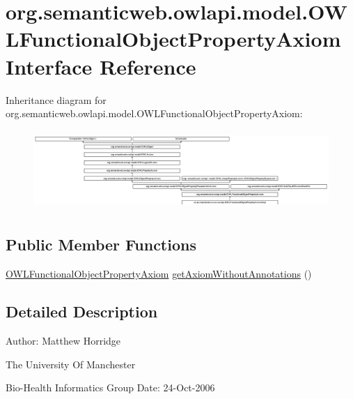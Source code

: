 \hypertarget{interfaceorg_1_1semanticweb_1_1owlapi_1_1model_1_1_o_w_l_functional_object_property_axiom}{\section{org.\-semanticweb.\-owlapi.\-model.\-O\-W\-L\-Functional\-Object\-Property\-Axiom Interface Reference}
\label{interfaceorg_1_1semanticweb_1_1owlapi_1_1model_1_1_o_w_l_functional_object_property_axiom}
}
Inheritance diagram for org.\-semanticweb.\-owlapi.\-model.\-O\-W\-L\-Functional\-Object\-Property\-Axiom\-:\begin{figure}[H]
\begin{center}
\leavevmode
\includegraphics[height=3.060109cm]{interfaceorg_1_1semanticweb_1_1owlapi_1_1model_1_1_o_w_l_functional_object_property_axiom}
\end{center}
\end{figure}
\subsection*{Public Member Functions}
\begin{DoxyCompactItemize}
\item 
\hyperlink{interfaceorg_1_1semanticweb_1_1owlapi_1_1model_1_1_o_w_l_functional_object_property_axiom}{O\-W\-L\-Functional\-Object\-Property\-Axiom} \hyperlink{interfaceorg_1_1semanticweb_1_1owlapi_1_1model_1_1_o_w_l_functional_object_property_axiom_ab53052e2a9703279e8c16963c3dd8c93}{get\-Axiom\-Without\-Annotations} ()
\end{DoxyCompactItemize}


\subsection{Detailed Description}
Author\-: Matthew Horridge\par
 The University Of Manchester\par
 Bio-\/\-Health Informatics Group Date\-: 24-\/\-Oct-\/2006 

